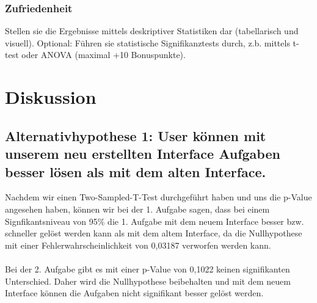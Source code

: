 \documentclass[a4paper,10pt]{scrartcl}
\begin{document}
\subsubsection*{Zufriedenheit} 
% 
% 
% 
% 
% 
% 
% 

Stellen sie die Ergebnisse mittels deskriptiver Statistiken dar (tabellarisch und visuell). 
Optional: Führen sie statistische Signifikanztests durch, z.b. mittels t-test oder ANOVA (maximal +10 Bonuspunkte). 

\section{Diskussion}

\subsection{Alternativhypothese 1:  User können mit unserem neu erstellten Interface Aufgaben besser lösen als mit dem alten Interface.} 

Nachdem wir einen Two-Sampled-T-Test durchgeführt haben und uns die p-Value angesehen haben, können wir bei
der 1. Aufgabe sagen, dass bei einem Signfikantsniveau von 95\% die 1. Aufgabe mit dem neuem Interface besser bzw. schneller gelöst werden
kann als mit dem altem Interface, da die Nullhypothese mit einer Fehlerwahrscheinlichkeit von 0,03187 verworfen werden kann.
\\ \\
Bei der 2. Aufgabe gibt es mit einer p-Value von 0,1022 keinen signifikanten Unterschied. Daher wird die Nullhypothese beibehalten und
mit dem neuem Interface können die Aufgaben nicht signifikant besser gelöst werden.
\\ \\
\end{document}
